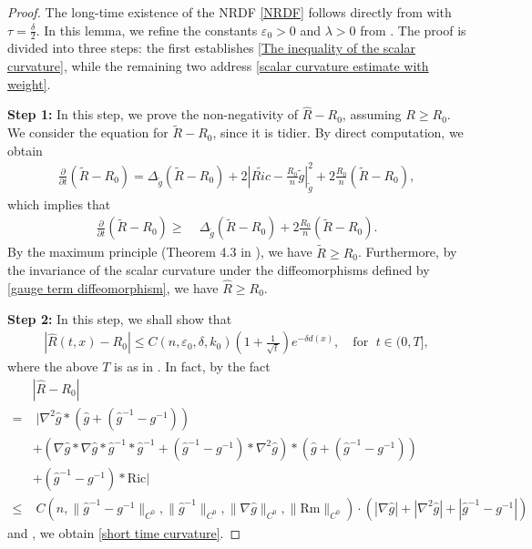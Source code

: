 \documentclass[12pt]{amsart}
\begin{document}
\begin{proof}

The long-time existence of the NRDF \eqref{NRDF} follows directly from  with $\tau = \frac{\delta}{2}$. In this lemma, we refine the constants $\varepsilon_0 > 0$ and $\lambda > 0$ from . The proof is divided into three steps: the first establishes \eqref{The inequality of the scalar curvature}, while the remaining two address \eqref{scalar curvature estimate with weight}.

\textbf{Step 1:} In this step, we prove the non-negativity of $\hat{R} - R_0$, assuming $R \geq R_0$. We consider the equation for $\tilde{R} - R_0$, since it is tidier. By direct computation, we obtain
\begin{align}\label{evolution equation of scalar curvature without weight}
    \frac{\partial}{\partial t} (\tilde{R} - R_0) = \Delta_{\tilde{g}}(\tilde{R} - R_0) + 2|\tilde{Ric} - \frac{R_0}{n} \tilde{g}|_{\tilde{g}}^2 + 2\frac{R_0}{n} (\tilde{R} - R_0),
\end{align}
which implies that 
\begin{align}
    \frac{\partial}{\partial t} (\tilde{R} - R_0) \geq&\; \Delta_{\tilde{g}}(\tilde{R} - R_0) + 2\frac{R_0}{n} (\tilde{R} - R_0).
\end{align}
By the maximum principle (Theorem 4.3 in \cite{QSW2013}), we have $\tilde{R} \geq R_0$. Furthermore, by the invariance of the scalar curvature under the  diffeomorphisms defined by \eqref{gauge term diffeomorphism}, we have $\hat{R} \geq R_0$. 

\textbf{Step 2:}
In this step, we shall show that 
\begin{align}\label{short time curvature}
    |\hat{R}(t, x) - R_0| \leq C(n, \varepsilon_0, \delta, k_0)(1 + \frac{1}{\sqrt{t}})e^{-\delta d(x)},\quad \text{for }\; t\in (0, T], 
\end{align}
where the above $T$ is as in . In fact, by the fact
\begin{equation}\label{evolution equation of scalar curvature formula 1}
    \begin{split}
        &|\hat{R} - R_0|\\
        =&\; |\nabla^2\hat{g}* (\hat{g} + (\hat{g}^{-1} - g^{-1}))\\
        &+ (\nabla\hat{g} * \nabla\hat{g} * \hat{g}^{-1} * \hat{g}^{-1} + (\hat{g}^{-1} - g^{-1}) * \nabla^2\hat{g}) * (\hat{g} + (\hat{g}^{-1} - g^{-1}))\\
        &+ (\hat{g}^{-1} - g^{-1}) * \mathrm{Ric}|\\
        \leq&\; C(n, \|\hat{g}^{-1} - g^{-1}\|_{C^0}, \|\hat{g}^{-1}\|_{C^0}, \|\nabla\hat{g}\|_{C^0}, \|\mathrm{Rm}\|_{C^0})\cdot (|\nabla\hat{g}| + |\nabla^2 \hat{g}| + |\hat{g}^{-1} - g^{-1}|)
    \end{split}
\end{equation}
and , we obtain \eqref{short time curvature}.


\end{proof}
\end{document}
